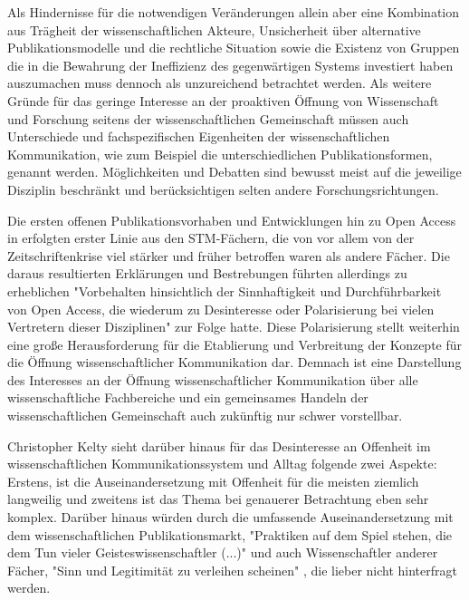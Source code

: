 Als Hindernisse für die notwendigen Veränderungen allein aber eine Kombination aus Trägheit der wissenschaftlichen Akteure, Unsicherheit über alternative Publikationsmodelle und die rechtliche Situation sowie die Existenz von Gruppen die in die Bewahrung der Ineffizienz des gegenwärtigen Systems investiert haben auszumachen \cite{nosek_2012_scientific} muss dennoch als unzureichend betrachtet werden. Als weitere Gründe für das geringe Interesse an der proaktiven Öffnung von Wissenschaft und Forschung seitens der wissenschaftlichen Gemeinschaft müssen auch Unterschiede und fachspezifischen Eigenheiten der wissenschaftlichen Kommunikation, wie zum Beispiel die unterschiedlichen Publikationsformen, genannt werden. Möglichkeiten und Debatten sind bewusst meist auf die jeweilige Disziplin beschränkt und berücksichtigen selten andere Forschungsrichtungen.

Die ersten offenen Publikationsvorhaben und Entwicklungen hin zu Open Access in erfolgten erster Linie aus den STM-Fächern, die von vor allem von der Zeitschriftenkrise viel stärker und früher betroffen waren als andere Fächer. Die daraus resultierten Erklärungen und Bestrebungen führten allerdings zu erheblichen "Vorbehalten hinsichtlich der Sinnhaftigkeit und Durchführbarkeit von Open Access, die wiederum zu Desinteresse oder Polarisierung bei vielen Vertretern dieser Disziplinen" \cite{naeder_2010_open} zur Folge hatte. Diese Polarisierung stellt weiterhin eine große Herausforderung für die Etablierung und Verbreitung der Konzepte für die Öffnung wissenschaftlicher Kommunikation dar. Demnach ist eine Darstellung des Interesses an der Öffnung wissenschaftlicher Kommunikation über alle wissenschaftliche Fachbereiche und ein gemeinsames Handeln der wissenschaftlichen Gemeinschaft auch zukünftig nur schwer vorstellbar.

Christopher Kelty sieht darüber hinaus für das Desinteresse an Offenheit im wissenschaftlichen Kommunikationssystem und Alltag folgende zwei Aspekte: Erstens, ist die Auseinandersetzung mit Offenheit für die meisten ziemlich langweilig und zweitens ist das Thema bei genauerer Betrachtung eben sehr komplex. Darüber hinaus würden durch die umfassende Auseinandersetzung mit dem wissenschaftlichen Publikationsmarkt, "Praktiken auf dem Spiel stehen, die dem Tun vieler Geisteswissenschaftler (...)" und auch Wissenschaftler anderer Fächer, "Sinn und Legitimität zu verleihen scheinen" \cite{Hirschi_2015_buch_oa}, die lieber nicht hinterfragt werden.

